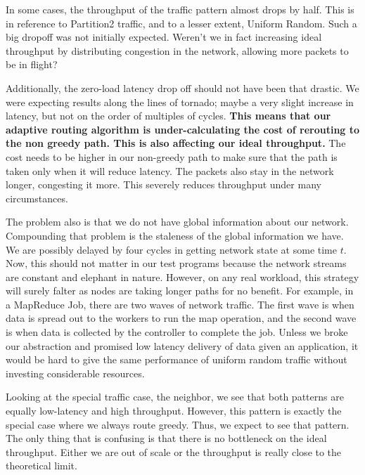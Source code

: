 \documentclass[10pt]{article}
\begin{document}
In some cases, the throughput of the traffic pattern almost drops by half.
This is in reference to Partition2 traffic, 
and to a lesser extent, Uniform Random. 
Such a big dropoff was not initially expected. 
Weren't we in fact increasing ideal throughput by distributing congestion in 
the network, allowing more packets to be in flight? 

Additionally, the zero-load latency drop off should not have been that drastic.
We were expecting results along the lines of tornado; maybe a very slight
increase in latency, but not on the order of multiples of cycles. 
\textbf{This means that our adaptive routing algorithm is under-calculating 
the cost of rerouting to the non greedy path.
This is also affecting our ideal throughput.}
The cost needs to be higher in our non-greedy path to make sure that the path 
is taken only when it will reduce latency.
The packets also stay in the network longer, congesting it more. 
This severely reduces throughput under many circumstances. \par

The problem also is that we do not have global information about our network.
Compounding that problem is the staleness of the global information we have.
We are possibly delayed by four cycles in getting network state at some time
$t$. 
Now, this should not matter in our test programs because the network streams
are constant and elephant in nature. 
However, on any real workload, this strategy will surely falter as nodes 
are taking longer paths for no benefit.
For example, in a MapReduce Job, there are two waves of network traffic.
The first wave is when data is spread out to the workers to run the map
operation, and the second wave is when data is collected by the controller
to complete the job. 
Unless we broke our abstraction and promised low latency delivery of data
given an application, it would be hard to give the same performance of 
uniform random traffic without investing considerable resources. \par

Looking at the special traffic case, the neighbor, we see that both 
patterns are equally low-latency and high throughput. 
However, this pattern is exactly the special case where we always 
route greedy. Thus, we expect to see that pattern.
The only thing that is confusing is that there is no bottleneck on the ideal
throughput.
Either we are out of scale or the throughput is really close to the theoretical
limit. \par
\end{document}

